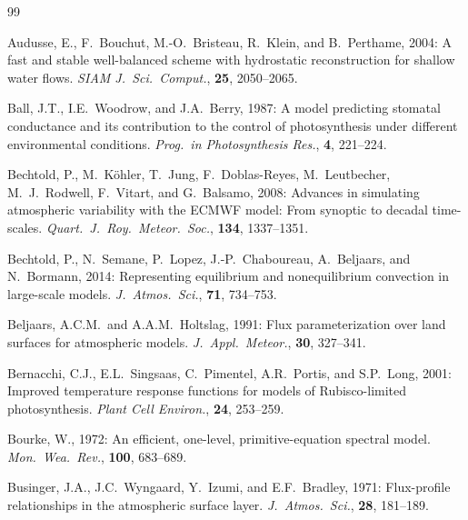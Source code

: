 \documentclass[11pt,twoside]{report}
\begin{document}
\renewcommand{\bibname}{References}
\begin{thebibliography}{99}

Audusse, E., F.~Bouchut, M.-O.~Bristeau, R.~Klein, and B.~Perthame, 2004:
A fast and stable well-balanced scheme with hydrostatic reconstruction for
shallow water flows.
\textit{SIAM J.\ Sci.\ Comput.}, \textbf{25}, 2050--2065.

Ball, J.T., I.E.~Woodrow, and J.A.~Berry, 1987:
A model predicting stomatal conductance and its contribution to the control
of photosynthesis under different environmental conditions.
\textit{Prog.\ in Photosynthesis Res.}, \textbf{4}, 221--224.

Bechtold, P., M.~K\"ohler, T.~Jung, F.~Doblas-Reyes, M.~Leutbecher,
M.~J.~Rodwell, F.~Vitart, and G.~Balsamo, 2008:
Advances in simulating atmospheric variability with the ECMWF model: From
synoptic to decadal time-scales.
\textit{Quart.\ J.\ Roy.\ Meteor.\ Soc.}, \textbf{134}, 1337--1351.

Bechtold, P., N.~Semane, P.~Lopez, J.-P.~Chaboureau, A.~Beljaars, and
N.~Bormann, 2014:
Representing equilibrium and nonequilibrium convection in large-scale models.
\textit{J.\ Atmos.\ Sci.}, \textbf{71}, 734--753.

Beljaars, A.C.M.\ and A.A.M.~Holtslag, 1991:
Flux parameterization over land surfaces for atmospheric models.
\textit{J.\ Appl.\ Meteor.}, \textbf{30}, 327--341.

Bernacchi, C.J., E.L.~Singsaas, C.~Pimentel, A.R.~Portis, and S.P.~Long, 2001:
Improved temperature response functions for models of Rubisco-limited
photosynthesis.
\textit{Plant Cell Environ.}, \textbf{24}, 253--259.

Bourke, W., 1972:
An efficient, one-level, primitive-equation spectral model.
\textit{Mon.\ Wea.\ Rev.}, \textbf{100}, 683--689.

Businger, J.A., J.C.~Wyngaard, Y.~Izumi, and E.F.~Bradley, 1971:
Flux-profile relationships in the atmospheric surface layer.
\textit{J.\ Atmos.\ Sci.}, \textbf{28}, 181--189.


\end{thebibliography}
\end{document}
